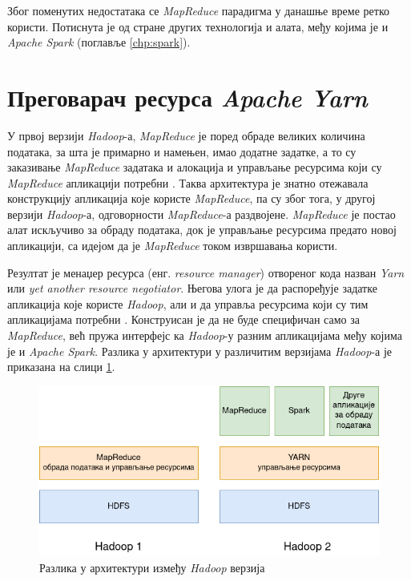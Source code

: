 \documentclass[12pt,oneside]{memoir}
\begin{document}
Због поменутих недостатака се \textit{MapReduce} парадигма у данашње време ретко користи. Потиснута је од стране других технологија и алата, међу којима је и \textit{Apache Spark}  (поглавље \ref{chp:spark}).

\section{Преговарач ресурса \textit{Apache Yarn}}
\label{sec:yarn}

У првој верзији \textit{Hadoop}-а, \textit{MapReduce} је поред обраде великих количина података, за шта је примарно и намењен, имао додатне задатке, а то су заказивање \textit{MapReduce} задатака и алокација и управљање ресурсима који су \textit{MapReduce} апликацији потребни \cite{hadoop_learning}. Таква архитектура је знатно отежавала конструкцију апликација које користе \textit{MapReduce}, па су због тога, у другој верзији \textit{Hadoop}-а, одговорности \textit{MapReduce}-а раздвојене. \textit{MapReduce} је постао алат искључиво за обраду података, док је управљање ресурсима предато новој апликацији, са идејом да је \textit{MapReduce} током извршавања користи.

Резултат је менаџер ресурса (енг. \textit{resource manager}) отвореног кода назван \textit{Yarn} \cite{yarn} или \textit{yet another resource negotiator}. Његова улога је да распоређује задатке апликација које користе \textit{Hadoop}, али и да управља ресурсима који су тим апликацијама потребни  \cite{hadoop_learning}. Конструисан је да не буде специфичан само за \textit{MapReduce}, већ пружа интерфејс ка \textit{Hadoop}-у разним апликацијама међу којима је и \textit{Apache Spark}. Разлика у архитектури у различитим верзијама \textit{Hadoop}-а је приказана на слици \ref{fig:yarn_hadoop_versions}.

\begin{figure}[!ht]
  \centering
  \includegraphics[width=1\textwidth]{pictures/mr_yarn_hadoop_versions.png}
  \caption{Разлика у архитектури између \textit{Hadoop} верзија}
  \label{fig:yarn_hadoop_versions}
\end{figure}
\end{document}
